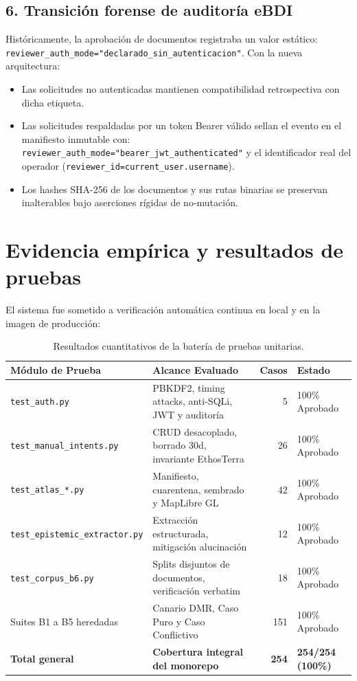\documentclass[11pt,a4paper]{article}
\begin{document}
\subsection{6. Transici\'on forense de auditor\'ia eBDI}
Hist\'oricamente, la aprobaci\'on de documentos registraba un valor est\'atico:
\texttt{reviewer\_auth\_mode="declarado\_sin\_autenticacion"}. Con la nueva arquitectura:
\begin{itemize}[leftmargin=*]
    \item Las solicitudes no autenticadas mantienen compatibilidad retrospectiva con dicha etiqueta.
    \item Las solicitudes respaldadas por un token Bearer v\'alido sellan el evento en el manifiesto inmutable con:
    \texttt{reviewer\_auth\_mode="bearer\_jwt\_authenticated"} y el identificador real del operador (\texttt{reviewer\_id=current\_user.username}).
    \item Los hashes SHA-256 de los documentos y sus rutas binarias se preservan inalterables bajo aserciones r\'igidas de no-mutaci\'on.
\end{itemize}

\section{Evidencia emp\'irica y resultados de pruebas}

El sistema fue sometido a verificaci\'on autom\'atica continua en local y en la imagen de producci\'on:

\begin{table}[H]
\centering
\small
\caption{Resultados cuantitativos de la bater\'ia de pruebas unitarias.}
\label{tab:pruebas}
\begin{tabularx}{\textwidth}{lp{6.0cm}rX}
\toprule
\textbf{M\'odulo de Prueba} & \textbf{Alcance Evaluado} & \textbf{Casos} & \textbf{Estado} \\
\midrule
\texttt{test\_auth.py} & PBKDF2, timing attacks, anti-SQLi, JWT y auditor\'ia & 5 & 100\% Aprobado \\
\texttt{test\_manual\_intents.py} & CRUD desacoplado, borrado 30d, invariante EthosTerra & 26 & 100\% Aprobado \\
\texttt{test\_atlas\_*.py} & Manifiesto, cuarentena, sembrado y MapLibre GL & 42 & 100\% Aprobado \\
\texttt{test\_epistemic\_extractor.py} & Extracci\'on estructurada, mitigaci\'on alucinaci\'on & 12 & 100\% Aprobado \\
\texttt{test\_corpus\_b6.py} & Splits disjuntos de documentos, verificaci\'on verbatim & 18 & 100\% Aprobado \\
Suites B1 a B5 heredadas & Canario DMR, Caso Puro y Caso Conflictivo & 151 & 100\% Aprobado \\
\midrule
\textbf{Total general} & \textbf{Cobertura integral del monorepo} & \textbf{254} & \textbf{254/254 (100\%)} \\
\bottomrule
\end{tabularx}
\end{table}
\end{document}
